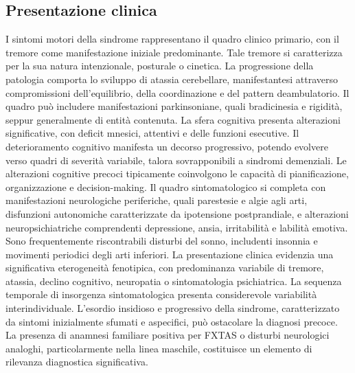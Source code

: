 \subsection{Presentazione clinica}
I sintomi motori della sindrome rappresentano il quadro clinico primario, con il tremore come manifestazione iniziale predominante. Tale tremore si caratterizza per la sua natura intenzionale, posturale o cinetica. La progressione della patologia comporta lo sviluppo di atassia cerebellare, manifestantesi attraverso compromissioni dell'equilibrio, della coordinazione e del pattern deambulatorio. Il quadro può includere manifestazioni parkinsoniane, quali bradicinesia e rigidità, seppur generalmente di entità contenuta.
La sfera cognitiva presenta alterazioni significative, con deficit mnesici, attentivi e delle funzioni esecutive. Il deterioramento cognitivo manifesta un decorso progressivo, potendo evolvere verso quadri di severità variabile, talora sovrapponibili a sindromi demenziali. Le alterazioni cognitive precoci tipicamente coinvolgono le capacità di pianificazione, organizzazione e decision-making.
Il quadro sintomatologico si completa con manifestazioni neurologiche periferiche, quali parestesie e algie agli arti, disfunzioni autonomiche caratterizzate da ipotensione postprandiale, e alterazioni neuropsichiatriche comprendenti depressione, ansia, irritabilità e labilità emotiva. Sono frequentemente riscontrabili disturbi del sonno, includenti insonnia e movimenti periodici degli arti inferiori.
La presentazione clinica evidenzia una significativa eterogeneità fenotipica, con predominanza variabile di tremore, atassia, declino cognitivo, neuropatia o sintomatologia psichiatrica. La sequenza temporale di insorgenza sintomatologica presenta considerevole variabilità interindividuale.
L'esordio insidioso e progressivo della sindrome, caratterizzato da sintomi inizialmente sfumati e aspecifici, può ostacolare la diagnosi precoce. La presenza di anamnesi familiare positiva per FXTAS o disturbi neurologici analoghi, particolarmente nella linea maschile, costituisce un elemento di rilevanza diagnostica significativa.

